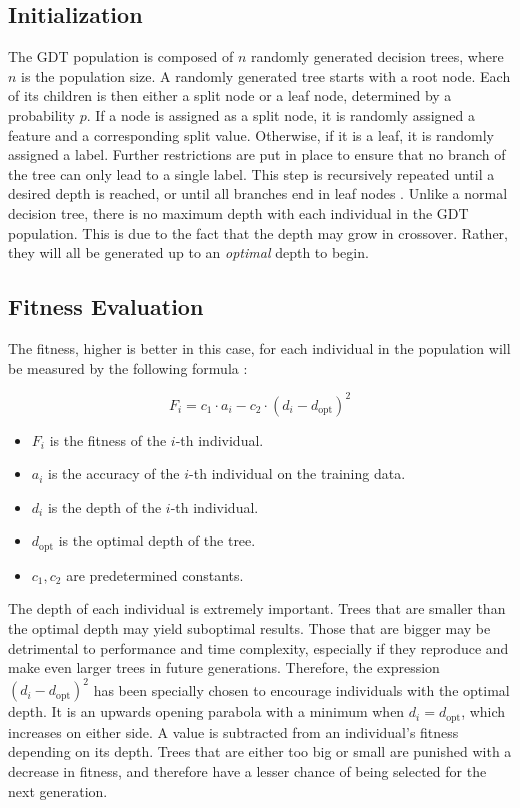 \documentclass[12pt]{article}
\begin{document}
\subsection{Initialization}

The GDT population is composed of $n$ randomly generated decision trees, where $n$ is the population size. A randomly generated tree starts with a root node. Each of its children is then either a split node or a leaf node, determined by a probability $p$. If a node is assigned as a split node, it is randomly assigned a feature and a corresponding split value. Otherwise, if it is a leaf, it is randomly assigned a label. Further restrictions are put in place to ensure that no branch of the tree can only lead to a single label. This step is recursively repeated until a desired depth is reached, or until all branches end in leaf nodes \autocite{faik_2020}. Unlike a normal decision tree, there is no maximum depth with each individual in the GDT population. This is due to the fact that the depth may grow in crossover. Rather, they will all be generated up to an \textit{optimal} depth to begin.

\subsection{Fitness Evaluation}

The fitness, higher is better in this case, for each individual in the population will be measured by the following formula \autocite{faik_2020}:

\[ F_i = c_1 \cdot a_i - c_2 \cdot (d_i - d_\text{opt})^2 \]

\begin{itemize}
    \item $F_i$ is the fitness of the $i$-th individual.
    \item $a_i$ is the accuracy of the $i$-th individual on the training data.
    \item $d_i$ is the depth of the $i$-th individual.
    \item $d_\text{opt}$ is the optimal depth of the tree.
    \item $c_1, c_2$ are predetermined constants.
\end{itemize}

The depth of each individual is extremely important. Trees that are smaller than the optimal depth may yield suboptimal results. Those that are bigger may be detrimental to performance and time complexity, especially if they reproduce and make even larger trees in future generations. Therefore, the expression $(d_i - d_\text{opt})^2$ has been specially chosen to encourage individuals with the optimal depth. It is an upwards opening parabola with a minimum when $d_i = d_\text{opt}$, which increases on either side. A value is subtracted from an individual's fitness depending on its depth. Trees that are either too big or small are punished with a decrease in fitness, and therefore have a lesser chance of being selected for the next generation.
\end{document}
